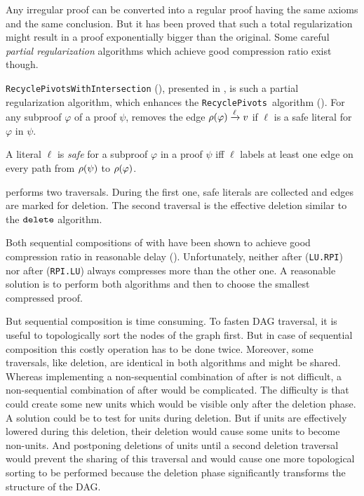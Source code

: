 \documentclass{llncs}
\begin{document}
Any irregular proof can be converted into a regular proof having the same axioms and the same
conclusion. But it has been proved \cite{Tseitin} that such a total regularization might result in a
proof exponentially bigger than the original. Some careful \emph{partial regularization} algorithms
which achieve good compression ratio exist though.

\texttt{RecyclePivotsWithIntersection} ({\RPI}), presented in \cite{LURPI}, is such a partial
regularization algorithm, which enhances the \texttt{RecyclePivots}~algorithm (\cite{RP08}).  For
any subproof $\varphi$ of a proof $\psi$, {\RPI} removes the edge $\rho(\varphi) \xrightarrow{\ell}
v$ if $\ell$ is a safe literal for $\varphi$ in $\psi$.

\begin{definition}
A literal $\ell$ is \emph{safe} for a subproof $\varphi$ in a proof $\psi$ iff $\ell$ labels at
least one edge on every path from $\rho(\psi)$ to $\rho(\varphi)$.
\end{definition}

{\RPI} performs two traversals. During the first one, safe literals are collected and edges are
marked for deletion. The second traversal is the effective deletion similar to the
$\FuncSty{delete}$ algorithm.

Both sequential compositions of {\LowerUnits} with {\RPI} have been shown to achieve good
compression ratio in reasonable delay (\cite{LURPI}). Unfortunately, neither {\LowerUnits} after
{\RPI} (\texttt{LU.RPI}) nor {\RPI} after {\LowerUnits} (\texttt{RPI.LU}) always compresses more than
the other one. A reasonable solution is to perform both algorithms and then to choose the smallest
compressed proof.

But sequential composition is time consuming. To fasten DAG traversal, it is useful to topologically
sort the nodes of the graph first. But in case of sequential composition this costly operation has to
be done twice. Moreover, some traversals, like deletion, are identical in both algorithms and might
be shared. Whereas implementing a non-sequential combination of {\RPI} after {\LowerUnits} is not
difficult, a non-sequential combination of {\LowerUnits} after {\RPI} would be complicated. The
difficulty is that {\RPI} could create some new units which would be visible only after the deletion
phase.  A solution could be to test for units during deletion. But if units are
effectively lowered during this deletion, their deletion would cause some units to become non-units.
And postponing deletions of units until a second deletion traversal would prevent the sharing of
this traversal and would cause one more topological sorting to be performed because the deletion phase
significantly transforms the structure of the DAG.
\end{document}
